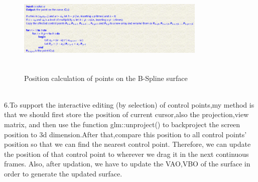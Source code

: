 \documentclass[acmtog]{acmart}
\begin{document}
\begin{figure}[h]
	\centering
	\includegraphics[width=9cm,height=4.5cm]{b_algorithm1.PNG}
	\caption{Position calculation of points on the B-Spline surface}
\end{figure}
\\\indent 6.To support the interactive editing (by selection) of control points,my method is that we should first store the position of current cursor,also the projection,view matrix, and then use the function glm::unproject() to backproject the screen position to 3d dimension.After that,compare this position to all control points' position so that we can find the nearest control point. Therefore, we can update the position of that control point to wherever we drag it in the next continuous frames. Also, after updation, we have to update the VAO,VBO of the surface in order to generate the updated surface.
\end{document}
